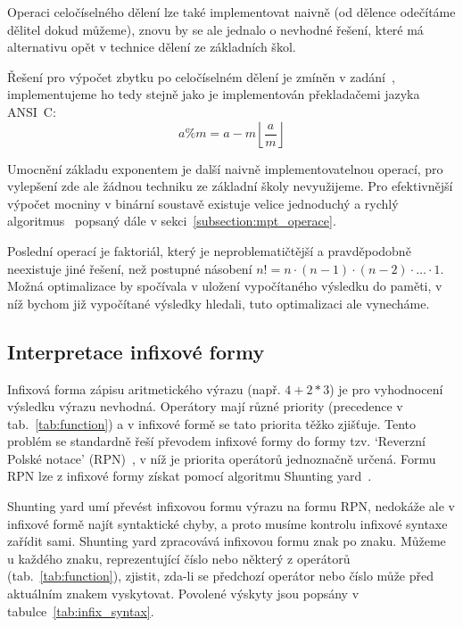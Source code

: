 Operaci celočíselného dělení lze také implementovat naivně (od dělence odečítáme dělitel dokud můžeme), znovu by se ale jednalo o nevhodné řešení, které má alternativu opět v technice dělení ze základních škol.

Řešení pro výpočet zbytku po celočíselném dělení je zmíněn v zadání~\cite{bib:zadani}, implementujeme ho tedy stejně jako je implementován překladačemi jazyka ANSI~C:\@
\begin{equation}
    a\%m=a-m\left\lfloor\frac{a}{m}\right\rfloor
\end{equation}

Umocnění základu exponentem je další naivně implementovatelnou operací, pro vylepšení zde ale žádnou techniku ze základní školy nevyužijeme. Pro efektivnější výpočet mocniny v binární soustavě existuje velice jednoduchý a rychlý algoritmus~\cite{bib:power} popsaný dále v sekci~\ref{subsection:mpt_operace}.

Poslední operací je faktoriál, který je neproblematičtější a pravděpodobně neexistuje jiné řešení, než postupné násobení $n!=n\cdot (n-1)\cdot (n-2)\cdot \dots{} \cdot 1$. Možná optimalizace by spočívala v uložení vypočítaného výsledku do paměti, v níž bychom již vypočítané výsledky hledali, tuto optimalizaci ale vynecháme.

\subsection{Interpretace infixové formy}
Infixová forma zápisu aritmetického výrazu (např. $4+2*3$) je pro vyhodnocení výsledku výrazu nevhodná. Operátory mají různé priority (precedence v tab.~\ref{tab:function}) a v infixové formě se tato priorita těžko zjišťuje. Tento problém se standardně řeší převodem infixové formy do formy tzv. `Reverzní Polské notace' (RPN)~\cite{bib:rpn}, v níž je priorita operátorů jednoznačně určená. Formu RPN lze z infixové formy získat pomocí algoritmu Shunting yard~\cite{bib:shunting_yard}.

Shunting yard umí převést infixovou formu výrazu na formu RPN, nedokáže ale v infixové formě najít syntaktické chyby, a proto musíme kontrolu infixové syntaxe zařídit sami. Shunting yard zpracovává infixovou formu znak po znaku. Můžeme u každého znaku, reprezentující číslo nebo některý z operátorů (tab.~\ref{tab:function}), zjistit, zda-li se předchozí operátor nebo číslo může před aktuálním znakem vyskytovat. Povolené výskyty jsou popsány v tabulce~\ref{tab:infix_syntax}.

